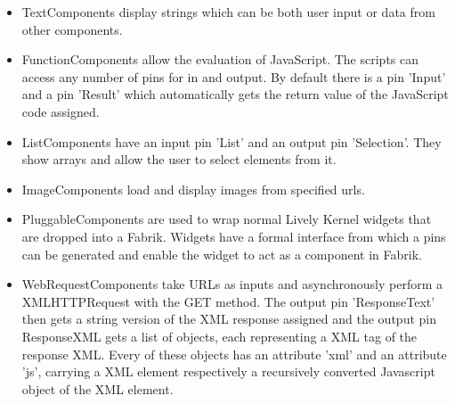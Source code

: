 \documentclass[pdftex, times, 10pt, twocolumn]{article}
\begin{document}
\begin{itemize}
  \item TextComponents display strings which can be both user input or data from other components. 


  \item FunctionComponents allow the evaluation of JavaScript. The scripts can access any  number of pins for in and output. By default there is a pin 'Input' and a pin 'Result' which automatically gets the return value of the JavaScript code assigned. 


  \item ListComponents have an input pin 'List' and an output pin 'Selection'. They show arrays and allow the user to select elements from it. 


  \item ImageComponents load and display images from specified urls. 


\end{itemize}

\begin{itemize}
  \item PluggableComponents are used to wrap normal Lively Kernel widgets that are dropped into a Fabrik. Widgets have a formal interface from which a pins can be generated and enable the widget to act as a component in Fabrik.  


  \item WebRequestComponents take URLs as inputs and asynchronously perform a XMLHTTPRequest with the GET method. The output pin 'ResponseText' then gets a string version of the XML response assigned and the output pin ResponseXML gets a list of objects, each representing a XML tag of the response XML. Every of these objects has an attribute 'xml' and an attribute 'js', carrying a XML element respectively a recursively converted Javascript object of the XML element.  


\end{itemize}
\end{document}
